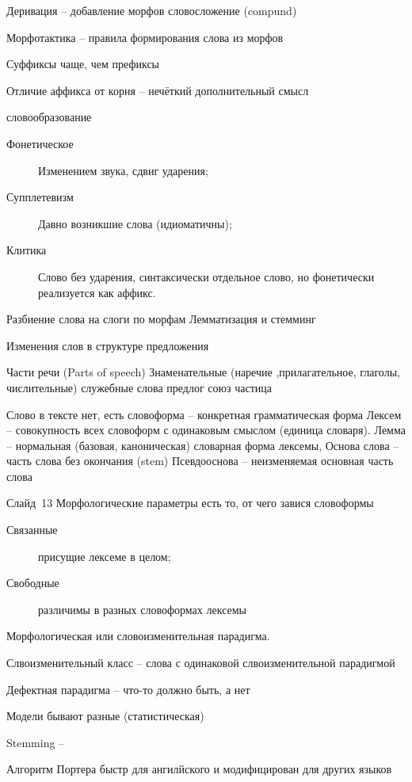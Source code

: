 \documentclass[a4paper]{article}
\newcommand{\eng}[1]{\foreignlanguage{english}{#1}}
\begin{document}
Деривация -- добавление морфов
словосложение (\eng{compund})

Морфотактика -- правила формирования слова из морфов

Суффиксы чаще, чем префиксы

Отличие аффикса от корня -- нечёткий дополнительный смысл

словообразование
\begin{description}
	\item[Фонетическое] Изменением звука, сдвиг ударения;
	\item[Супплетевизм] Давно возникшие слова (идиоматичны);
	\item[Клитика] Слово без ударения, синтаксически отдельное слово, но фонетически реализуется как аффикс.
\end{description}

Разбиение слова на слоги по морфам
Лемматизация и стемминг

Изменения слов в структуре предложения

Части речи (\eng{Parts of speech})
Знаменательные (наречие ,прилагательное, глаголы, числительные)
служебные слова предлог союз частица


Слово в тексте нет, есть словоформа -- конкретная грамматическая форма
Лексем -- совокупность всех словоформ с одинаковым смыслом (единица словаря).
Лемма -- нормальная (базовая, каноническая) словарная форма лексемы,
Основа слова -- часть слова без окончания (stem)
Псевдооснова -- неизменяемая основная часть слова

Слайд~13
Морфологические параметры есть то, от чего завися словоформы

\begin{description}
	\item[Связанные] присущие лексеме в целом;
	\item[Свободные] различимы в разных словоформах лексемы
\end{description}

Морфологическая или словоизменительная парадигма.

Слвоизменительный класс -- слова с одинаковой слвоизменительной парадигмой

Дефектная парадигма -- что-то должно быть, а нет

Модели бывают разные (статистическая)

\eng{Stemming} -- 

Алгоритм Портера быстр для ангилйского и модифицирован для других языков

\end{document}
